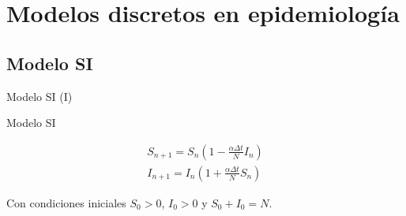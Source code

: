 

\section{Modelos discretos en epidemiología}


\subsection{Modelo SI}


\begin{frame}{Modelo SI (I)}

    \begin{block}{Modelo SI}

        \begin{equation}
        \label{eqn: SI}
        \begin{aligned}
        S_{n+1}=S_n\left( 1-\frac{\alpha\Delta t}{N}I_n\right) \\
        I_{n+1}=I_n\left( 1+\frac{\alpha\Delta t}{N}S_n\right)
        \end{aligned}
        \end{equation}

        Con condiciones iniciales $S_0>0$, $I_0>0$ y $S_0+I_0=N$.
        

    \end{block}  


\end{frame}

